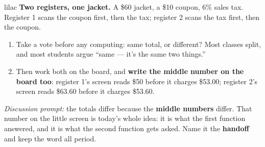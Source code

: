 \documentclass[10pt]{article}
\begin{document}
\begin{skillbox}{lilac}
    \textbf{Two registers, one jacket.} A \$60 jacket, a \$10 coupon, 6\% sales
    tax. Register 1 scans the coupon first, then the tax; register 2 scans the
    tax first, then the coupon.
    \begin{enumerate}[itemsep=2pt]
        \item Take a vote before any computing: same total, or different? Most
              classes split, and most students argue ``same --- it's the same two
              things.''
        \item Then work both on the board, and \textbf{write the middle number on
              the board too}: register 1's screen reads \$50 before it charges
              \$53.00; register 2's screen reads \$63.60 before it charges
              \$53.60.
    \end{enumerate}
    \textit{Discussion prompt:} the totals differ because the \textbf{middle
    numbers} differ. That number on the little screen is today's whole idea: it
    is what the first function answered, and it is what the second function gets
    asked. Name it the \textbf{handoff} and keep the word all period.
\end{skillbox}
\end{document}
